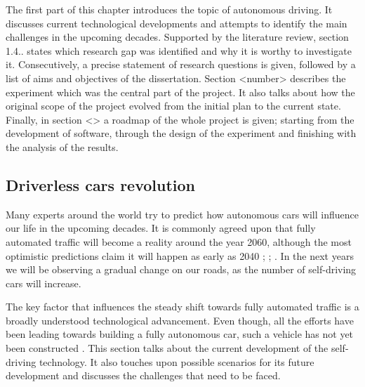 \documentclass[11pt,english]{article}
\begin{document}
\par
The first part of this chapter introduces the topic of autonomous driving. It discusses current technological developments and attempts to identify the main challenges in the upcoming decades. Supported by the literature review, section 1.4.. states which research gap was identified and why it is worthy to investigate it. Consecutively, a precise statement of research questions is given, followed by a list of aims and objectives of the dissertation. Section <number> describes the experiment which was the central part of the project. It also talks about how the original scope of the project evolved from the initial plan to the current state. Finally, in section <> a roadmap of the whole project is given; starting from the development of software, through the design of the experiment and finishing with the analysis of the results.






\subsection{Driverless cars revolution}

Many experts around the world try to predict how autonomous cars will influence our life in the upcoming decades. It is commonly agreed upon that fully automated traffic will become a reality around the year 2060, although the most optimistic predictions claim it will happen as early as 2040 \citep{kitti2012we}; \citep{litman2014autonomous}; \citep{sivak2015road}. In the next years we will be observing a gradual change on our roads, as the number of self-driving cars will increase. 
\par
The key factor that influences the steady shift towards fully automated traffic is a broadly understood technological advancement. Even though, all the efforts have been leading towards building a fully autonomous car, such a vehicle has not yet been constructed \citep{litman2014autonomous}. 
This section talks about the current development of the self-driving  technology. It also touches upon possible scenarios for its future development and discusses the challenges that need to be faced.


\end{document}

